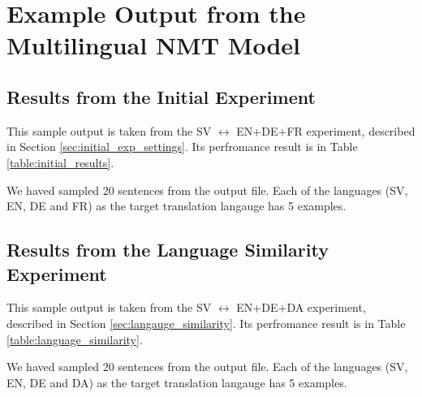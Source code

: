 \documentclass[thesis,fonts=libertine]{cluu}
\begin{document}
\appendix
\chapter{Example Output from the Multilingual NMT Model}
\label{chap:example_output}

\section{Results from the Initial Experiment}
This sample output is taken from the SV $\leftrightarrow$ EN+DE+FR experiment, described in Section \ref{sec:initial_exp_settings}. Its perfromance result is in Table \ref{table:initial_results}.

We haved sampled 20 sentences from the output file. Each of the languages (SV, EN, DE and FR) as the target translation langauge has 5 examples.



\section{Results from the Language Similarity Experiment}
This sample output is taken from the SV $\leftrightarrow$ EN+DE+DA experiment, described in Section \ref{sec:langauge_similarity}. Its perfromance result is in Table \ref{table:language_similarity}.

We haved sampled 20 sentences from the output file. Each of the languages (SV, EN, DE and DA) as the target translation langauge has 5 examples.



\printbibliography
\end{document}
